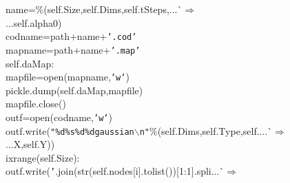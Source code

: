 {{\begin{tabbing}
\hspace{72pt}name\hspace{6pt}=\%(self.Size,self.Dims,self.tSteps,{}...\`$\Rightarrow$\\
...{}self.alpha0)\\
\hspace{48pt}codname\hspace{6pt}=\hspace{6pt}path+name+{\texttt{{'}.cod{'}}}\\
\hspace{48pt}mapname\hspace{6pt}=\hspace{6pt}path+name+{\texttt{{'}.map{'}}}\\
\hspace{6pt}self.daMap:\\
\hspace{72pt}mapfile\hspace{6pt}=\hspace{6pt}open(mapname,{\texttt{{'}w{'}}})\\
\hspace{72pt}pickle.dump(self.daMap,mapfile)\\
\hspace{72pt}mapfile.close()\\
\hspace{48pt}outf\hspace{6pt}=\hspace{6pt}open(codname,{\texttt{{'}w{'}}})\\
\hspace{48pt}outf.write({\texttt{\string"\%d\hspace{6pt}\%s\hspace{6pt}\%d\hspace{6pt}\%d\hspace{6pt}gaussian$\backslash$n\string"}}\%(self.Dims,self.Type,self.{}...\`$\Rightarrow$\\
...{}X,self.Y))\\
\hspace{6pt}i\hspace{6pt}xrange(self.Size):\\
\hspace{72pt}outf.write({\texttt{{'}\hspace{6pt}{'}}}.join(str(self.nodes{[}i{]}.tolist()){[}1:\dash{}1{]}.spli{}...\`$\Rightarrow$\\

\end{tabbing}}}
